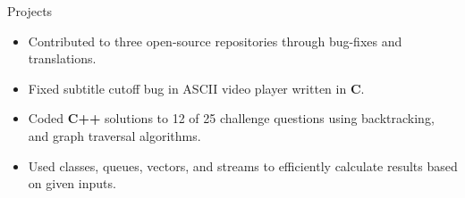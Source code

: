 \documentclass{resume} %
\begin{document}
\begin{workSection}{Projects}
	
	\customItem[
	title=Hacktoberfest 2023,
	duration=October 2023,
	]
	\begin{itemize}
		\vspace{-0.5em}
		\itemsep -6pt {}
		\item Contributed to three open-source repositories through bug-fixes and translations.
		\item Fixed subtitle cutoff bug in ASCII video player written in \textbf{C}. \href{https://github.com/aidancrowther/ASCIIPlay}{\faExternalLink}
	\end{itemize}
	\customItem[
	title=\href{https://github.com/AshkanArabim/advent-of-code-2022}{Advent of Code 2022 - Annual Programming Challenge \faExternalLink},
	duration=August 2023,
	]
	\begin{itemize}
		\vspace{-0.5em}
		\itemsep -6pt {}
		\item Coded \textbf{C++} solutions to 12 of 25 challenge questions using backtracking, and graph traversal algorithms.
		\item Used classes, queues, vectors, and streams to efficiently calculate results based on given inputs.
	\end{itemize}




\end{workSection}
\end{document}
